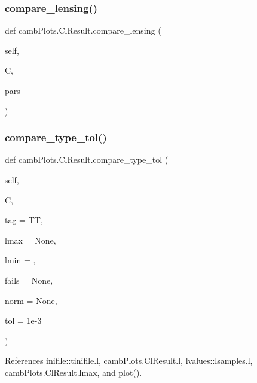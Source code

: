 \subsubsection{\texorpdfstring{compare\+\_\+lensing()}{compare\_lensing()}}
{\footnotesize\ttfamily def camb\+Plots.\+Cl\+Result.\+compare\+\_\+lensing (\begin{DoxyParamCaption}\item[{}]{self,  }\item[{}]{C,  }\item[{}]{pars }\end{DoxyParamCaption})}

\mbox{\label{classcambPlots_1_1ClResult_aaffae6fc9084e491c64e5ae37dfd9cec}} 
\subsubsection{\texorpdfstring{compare\+\_\+type\+\_\+tol()}{compare\_type\_tol()}}
{\footnotesize\ttfamily def camb\+Plots.\+Cl\+Result.\+compare\+\_\+type\+\_\+tol (\begin{DoxyParamCaption}\item[{}]{self,  }\item[{}]{C,  }\item[{}]{tag = {\ttfamily \textquotesingle{}\mbox{\hyperlink{classcambPlots_1_1ClResult_ac634df087ab7f5739dd8409c61917b2b}{TT}}\textquotesingle{}},  }\item[{}]{lmax = {\ttfamily None},  }\item[{}]{lmin = {},  }\item[{}]{fails = {\ttfamily None},  }\item[{}]{norm = {\ttfamily None},  }\item[{}]{tol = {\ttfamily 1e-\/3} }\end{DoxyParamCaption})}



References inifile\+::tinifile.\+l, camb\+Plots.\+Cl\+Result.\+l, lvalues\+::lsamples.\+l, camb\+Plots.\+Cl\+Result.\+lmax, and plot().

